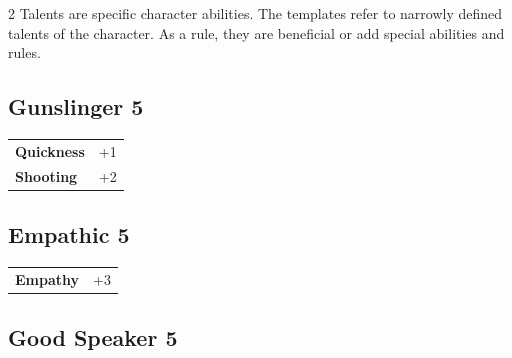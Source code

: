\begin{multicols}{2}
Talents are specific character abilities. The templates refer to narrowly defined talents of the character. As a rule, they are beneficial or add special abilities and rules.

\begin{tcolorbox}
    \subsection*{Gunslinger \hfill \small{5 }}
    \tcblower




\begin{tabular}{@{}ll@{}}
    \textbf{Quickness} & +1\\
    \textbf{Shooting} & +2\\
\end{tabular}


\end{tcolorbox}

\begin{tcolorbox}
    \subsection*{Empathic \hfill \small{5 }}
    \tcblower




\begin{tabular}{@{}ll@{}}
    \textbf{Empathy} & +3\\
\end{tabular}


\end{tcolorbox}

\begin{tcolorbox}
    \subsection*{Good Speaker \hfill \small{5 }}
    \tcblower





\end{tcolorbox}
\end{multicols}
